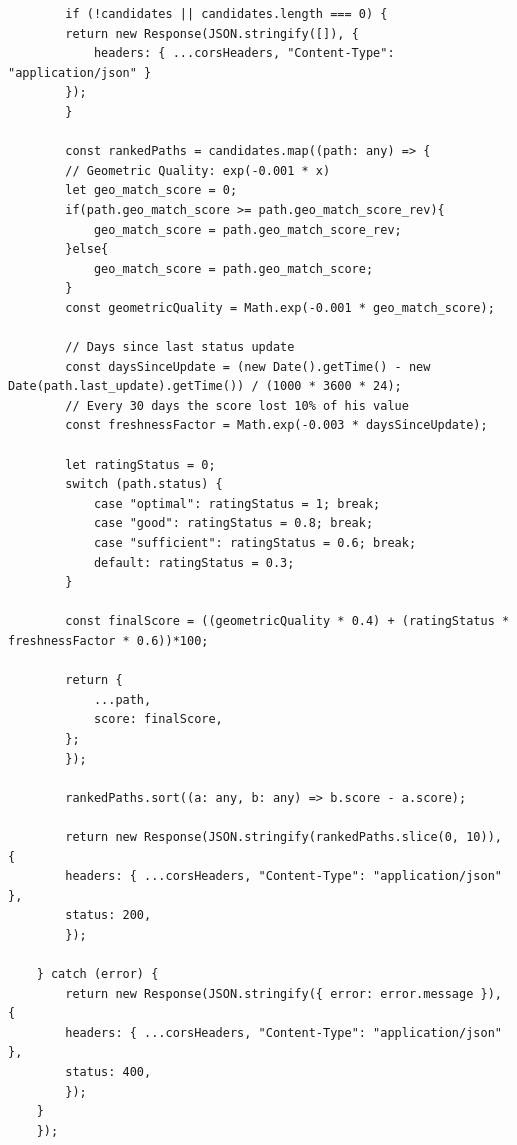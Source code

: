 \begin{itemize}
\begin{lstlisting}
        if (!candidates || candidates.length === 0) {
        return new Response(JSON.stringify([]), { 
            headers: { ...corsHeaders, "Content-Type": "application/json" } 
        });
        }

        const rankedPaths = candidates.map((path: any) => {
        // Geometric Quality: exp(-0.001 * x)
        let geo_match_score = 0;
        if(path.geo_match_score >= path.geo_match_score_rev){
            geo_match_score = path.geo_match_score_rev;
        }else{
            geo_match_score = path.geo_match_score;
        }
        const geometricQuality = Math.exp(-0.001 * geo_match_score);

        // Days since last status update 
        const daysSinceUpdate = (new Date().getTime() - new Date(path.last_update).getTime()) / (1000 * 3600 * 24);
        // Every 30 days the score lost 10% of his value 
        const freshnessFactor = Math.exp(-0.003 * daysSinceUpdate);

        let ratingStatus = 0;
        switch (path.status) {
            case "optimal": ratingStatus = 1; break;
            case "good": ratingStatus = 0.8; break;
            case "sufficient": ratingStatus = 0.6; break;
            default: ratingStatus = 0.3;
        }

        const finalScore = ((geometricQuality * 0.4) + (ratingStatus * freshnessFactor * 0.6))*100;

        return {
            ...path,
            score: finalScore,
        };
        });
        
        rankedPaths.sort((a: any, b: any) => b.score - a.score);

        return new Response(JSON.stringify(rankedPaths.slice(0, 10)), {
        headers: { ...corsHeaders, "Content-Type": "application/json" },
        status: 200,
        });

    } catch (error) {
        return new Response(JSON.stringify({ error: error.message }), {
        headers: { ...corsHeaders, "Content-Type": "application/json" },
        status: 400,
        });
    }
    });
    \end{lstlisting}
\end{itemize}

